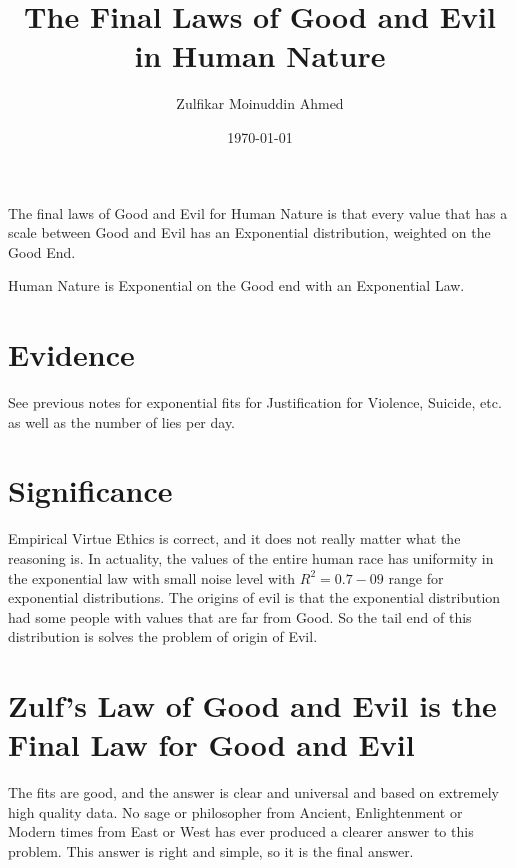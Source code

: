 \documentclass{amsart}
\title{The Final Laws of Good and Evil in Human Nature}
\author{Zulfikar Moinuddin Ahmed}
\date{\today}
\begin{document}
\maketitle

The final laws of Good and Evil for Human Nature is that every value that has a scale between Good and Evil has an Exponential distribution, weighted on the Good End.  

Human Nature is Exponential on the Good end with an Exponential Law.

\section{Evidence}
See previous notes for exponential fits for Justification for Violence, Suicide, etc. as well as the number of lies per day.

\section{Significance}
Empirical Virtue Ethics is correct, and it does not really matter what the reasoning is.  In actuality, the values of the entire human race has uniformity in the exponential law with small noise level with $R^2=0.7-09$ range for exponential distributions.  The origins of evil is that the exponential distribution had some people with values that are far from Good.  So the tail end of this distribution is solves the problem of origin of Evil.  

\section{Zulf's Law of Good and Evil is the Final Law for Good and Evil}

The fits are good, and the answer is clear and universal and based on extremely high quality data.  No sage or philosopher from Ancient, Enlightenment or Modern times from East or West has ever produced a clearer answer to this problem.  This answer is right and simple, so it is the final answer.
\end{document}
